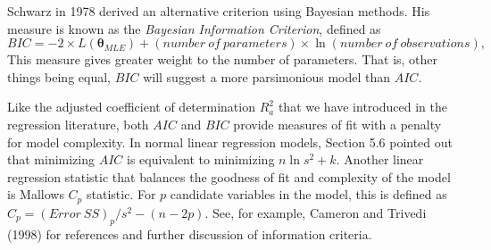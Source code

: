 Schwarz in 1978 derived an alternative criterion using Bayesian
methods. His measure is known as the \emph{Bayesian Information
Criterion}, defined as
\begin{equation*}
BIC = -2 \times L(\boldsymbol \theta_{MLE}) + (number~of~parameters)
\times \ln (number~of~observations),
\end{equation*}
This measure gives greater weight to the number of parameters. That
is, other things being equal, $BIC$ will suggest a more parsimonious
model than $AIC$.

Like the adjusted coefficient of determination $R^2_a$ that we have
introduced in the regression literature, both $AIC$ and $BIC$
provide measures of fit with a penalty for model complexity. In
normal linear regression models, Section 5.6 pointed out that
minimizing $AIC$ is equivalent to minimizing $ n \ln s^2 + k$.
Another linear regression statistic that balances the goodness of
fit and complexity of the model is Mallows $C_p$ statistic. For $p$
candidate variables in the model, this is defined as $C_p =
(Error~SS)_p/s^2 - (n-2p).$ See, for example, Cameron and Trivedi
(1998) for references and further discussion of information
criteria.
